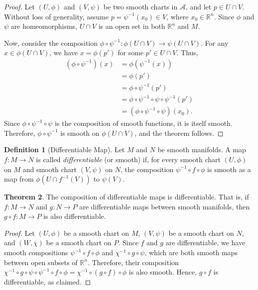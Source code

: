 \documentclass{article}
\theoremstyle{definition}
\newtheorem{definition}{Definition}[section]
\newtheorem{theorem}[definition]{Theorem}
\numberwithin{equation}{section}
\begin{document}
\begin{proof}
Let $(U, \phi)$ and $(V, \psi)$ be two smooth charts in $\mathcal{A}$, and let $p \in U \cap V$. Without loss of generality, assume $p = \psi^{-1}(x_0) \in V$, where $x_0 \in \mathbb{R}^n$. Since $\phi$ and $\psi$ are homeomorphisms, $U \cap V$ is an open set in both $\mathbb{R}^n$ and $M$.

Now, consider the composition $\phi \circ \psi^{-1}: \phi(U \cap V) \to \psi(U \cap V)$. For any $x \in \phi(U \cap V)$, we have $x = \phi(p')$ for some $p' \in U \cap V$. Thus,
\[\begin{aligned}
(\phi \circ \psi^{-1})(x) &= \phi(\psi^{-1}(x)) \\
&= \phi(p') \\
&= \phi \circ \psi^{-1}(p') \\
&= \phi \circ \psi^{-1} \circ \psi \circ \psi^{-1}(p') \\
&= (\phi \circ \psi^{-1} \circ \psi)(x_0).
\end{aligned}\]
Since $\phi \circ \psi^{-1} \circ \psi$ is the composition of smooth functions, it is itself smooth. Therefore, $\phi \circ \psi^{-1}$ is smooth on $\phi(U \cap V)$, and the theorem follows.
\end{proof}

\begin{definition}[Differentiable Map]
Let $M$ and $N$ be smooth manifolds. A map $f: M \to N$ is called \textit{differentiable} (or smooth) if, for every smooth chart $(U, \phi)$ on $M$ and smooth chart $(V, \psi)$ on $N$, the composition $\psi^{-1} \circ f \circ \phi$ is smooth as a map from $\phi(U \cap f^{-1}(V))$ to $\psi(V)$.
\end{definition}

\begin{theorem}
The composition of differentiable maps is differentiable. That is, if $f: M \to N$ and $g: N \to P$ are differentiable maps between smooth manifolds, then $g \circ f: M \to P$ is also differentiable.
\end{theorem}

\begin{proof}
Let $(U, \phi)$ be a smooth chart on $M$, $(V, \psi)$ be a smooth chart on $N$, and $(W, \chi)$ be a smooth chart on $P$. Since $f$ and $g$ are differentiable, we have smooth compositions $\psi^{-1} \circ f \circ \phi$ and $\chi^{-1} \circ g \circ \psi$, which are both smooth maps between open subsets of $\mathbb{R}^n$. Therefore, their composition $\chi^{-1} \circ g \circ \psi \circ \psi^{-1} \circ f \circ \phi = \chi^{-1} \circ (g \circ f) \circ \phi$ is also smooth. Hence, $g \circ f$ is differentiable, as claimed.
\end{proof}
\end{document}
